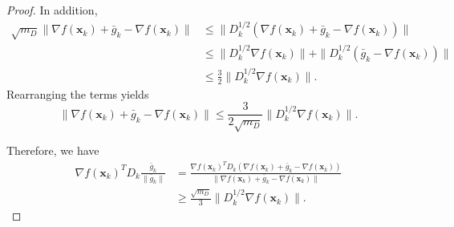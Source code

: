 \documentclass[10pt,a4paper]{amsart}
\newcommand{\barg}{\bar{g}}
\newcommand{\bx}{\boldsymbol{x}}
\begin{document}
\begin{proof}
In addition, 
\begin{align*}
    \sqrt{m_D}\|\nabla f(\bx_k) + \barg_k - \nabla f(\bx_k)\| & \leq \|D_k^{1/2}(\nabla f(\bx_k) + \barg_k - \nabla f(\bx_k))\|\\
    & \leq \|D_k^{1/2}\nabla f(\bx_k)\| + \| D_k^{1/2}(\barg_k - \nabla f(\bx_k))\| \\
    & \leq \frac{3}{2}\|D_k^{1/2}\nabla f(\bx_k)\|.
\end{align*}
Rearranging the terms yields
\begin{equation*}
   \|\nabla f(\bx_k) + \barg_k - \nabla f(\bx_k)\| \leq  \frac{3}{2\sqrt{m_D}}\|D_k^{1/2}\nabla f(\bx_k)\|.
\end{equation*}

Therefore, we have
\begin{align*}
    \nabla f(\bx_k)^TD_k\frac{\barg_k}{\|\barg_k\|} & = \frac{\nabla f(\bx_k)^TD_k(\nabla f(\bx_k)+\barg_k-\nabla f(\bx_k))}{\|\nabla f(\bx_k)+\barg_k-\nabla f(\bx_k)\|}\\
    & \geq \frac{\sqrt{m_D}}{3}\|D_k^{1/2}\nabla f(\bx_k)\|.
\end{align*}



\end{proof}
\end{document}
